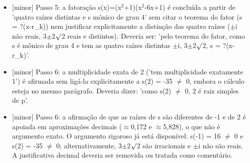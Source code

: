 \documentclass{article}%
\begin{document}
\begin{itemize}%
\item%
{[}minor{]} Passo 5: a fatoração s(x)=(x$^2$+1)(x$^2$-6x+1) é concluída a partir de 'quatro raízes distintas e s mônico de grau 4' sem citar o teorema do fator (s = ?(x-r\_k)) nem justificar explicitamente a distinção das quatro raízes ($\pm$i não reais, 3$\pm$2$\surd$2 reais e distintos). Deveria ser: 'pelo teorema do fator, como s é mônico de grau 4 e tem as quatro raízes distintas $\pm$i, 3$\pm$2$\surd$2, s = ?(x-r\_k)'.%
\item%
{[}minor{]} Passo 6: a multiplicidade exata de 2 ('tem multiplicidade exatamente 1') é afirmada sem ligá{-}la explicitamente a s(2) = -35 $\neq$ 0, embora o cálculo esteja no mesmo parágrafo. Deveria dizer: 'como s(2) $\neq$ 0, 2 é raiz simples de p'.%
\item%
{[}minor{]} Passo 6: a afirmação de que as raízes de s são diferentes de -1 e de 2 é apoiada em aproximações decimais ($\approx$0,172 e $\approx$5,828), o que não é argumento exato. O argumento rigoroso já está disponível: s(-1) = 16 $\neq$ 0 e s(2) = -35 $\neq$ 0; alternativamente, 3$\pm$2$\surd$2 são irracionais e $\pm$i não são reais. A justificativa decimal deveria ser removida ou tratada como comentário.%
\end{itemize}%
\end{document}
